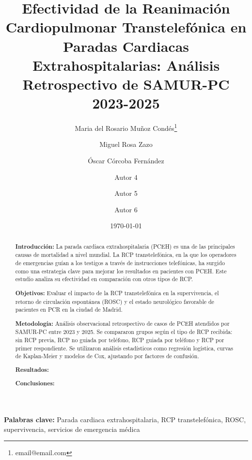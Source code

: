 \documentclass[10pt,a4paper]{article}
\title{\textbf{Efectividad de la Reanimación Cardiopulmonar Transtelefónica en Paradas Cardiacas Extrahospitalarias: Análisis Retrospectivo de SAMUR-PC 2023-2025}}
\author[1]{Maria del Rosario Muñoz Condés\thanks{email@email.com}}
\author[1]{Miguel Rosa Zazo}
\author[1]{Óscar Córcoba Fernández}
\author[1]{Autor 4}
\author[1]{Autor 5}
\author[1]{Autor 6}
\affil[1]{SAMUR-PC, Madrid, España}
\date{\today}
\begin{document}
\maketitle

\noindent\textbf{Palabras clave:} Parada cardiaca extrahospitalaria, RCP transtelefónica, ROSC, supervivencia, servicios de emergencia médica

\begin{abstract}
\textbf{Introducción:} La parada cardiaca extrahospitalaria (PCEH) es una de las principales causas de mortalidad a nivel mundial. La RCP transtelefónica, en la que los operadores de emergencias guían a los testigos a través de instrucciones telefónicas, ha surgido como una estrategia clave para mejorar los resultados en pacientes con PCEH. Este estudio analiza su efectividad en comparación con otros tipos de RCP.

\textbf{Objetivos:} Evaluar el impacto de la RCP transtelefónica en la supervivencia, el retorno de circulación espontánea (ROSC) y el estado neurológico favorable de pacientes en PCR en la ciudad de Madrid.

\textbf{Metodología:} Análisis observacional retrospectivo de casos de PCEH atendidos por SAMUR-PC entre 2023 y 2025. Se compararon grupos según el tipo de RCP recibida: sin RCP previa, RCP no guiada por teléfono, RCP guiada por teléfono y RCP por primer respondiente. Se utilizaron análisis estadísticos como regresión logística, curvas de Kaplan-Meier y modelos de Cox, ajustando por factores de confusión.


\textbf{Resultados:} 


\textbf{Conclusiones:} 

\end{abstract}


\newpage
\end{document}
